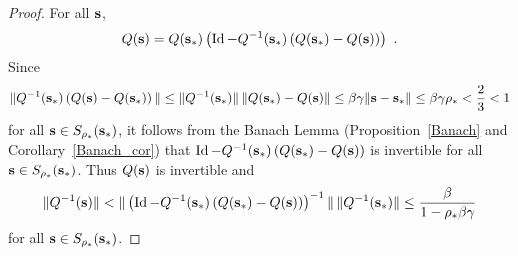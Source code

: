 \begin{proof}
For all $\mathbf{s}$,
\[
Q(\mathbf{s}) = Q(\mathbf{s}_\ast) \left( \operatorname{Id} - Q^{-1}(\mathbf{s}_\ast) \left(
Q(\mathbf{s}_\ast) - Q(\mathbf{s}) \right) \right) \ .
\]
Since
\[
\| Q^{-1}(\mathbf{s}_\ast) \left( Q(\mathbf{s}) - Q(\mathbf{s}_\ast)
\right) \| \leq \| Q^{-1}(\mathbf{s}_\ast) \| \,
\| Q(\mathbf{s}_\ast) - Q(\mathbf{s}) \|  \leq \beta\gamma
\| \mathbf{s} - \mathbf{s}_\ast \| \leq \beta\gamma\rho_\ast
< \frac{2}{3} < 1
\]
for all $\mathbf{s} \in S_{\rho_\ast}(\mathbf{s}_\ast)$, it follows from
the Banach Lemma (Proposition~\ref{Banach} and
Corollary~\ref{Banach_cor}) that
$\operatorname{Id} - Q^{-1}(\mathbf{s}_\ast) \left( Q(\mathbf{s}_\ast) - Q(\mathbf{s}) \right)$
is invertible for all
$\mathbf{s} \in S_{\rho_\ast}(\mathbf{s}_\ast)$.  Thus $Q(\mathbf{s})$ is
invertible and
\[
\| Q^{-1}(\mathbf{s}) \| <
\| \left( \operatorname{Id} - Q^{-1}(\mathbf{s}_\ast) \left(
Q(\mathbf{s}_\ast) - Q(\mathbf{s}) \right) \right)^{-1} \| \,
\| Q^{-1}(\mathbf{s}_\ast) \| \leq
\frac{\beta}{1-\rho_\ast \beta\gamma}
\]
for all $\mathbf{s} \in S_{\rho_\ast}(\mathbf{s}_\ast)$.


\end{proof}
